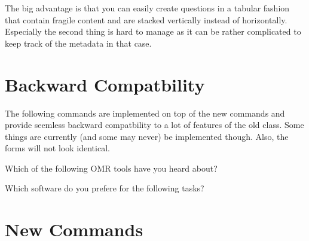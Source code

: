 \documentclass[
  english,
  print_questionnaire_id,
  oneside,
  pagemark,
  stamp]{sdapsclassic}
\begin{document}
\begin{questionnaire}
    The big advantage is that you can easily create questions in a tabular
    fashion that contain fragile content and are stacked vertically instead of
    horizontally. Especially the second thing is hard to manage as it can be
    rather complicated to keep track of the metadata in that case.

    \section{Backward Compatbility}

    The following commands are implemented on top of the new commands and provide
    seemless backward compatbility to a lot of features of the old class. Some
    things are currently (and some may never) be implemented though. Also, the
    forms will not look identical.



    \begin{choicequestion}[cols=3]{Which of the following OMR tools have you heard about?}

    \end{choicequestion}

    \begin{choicegroup}{Which software do you prefere for the following tasks?}
      \groupaddchoice{\LaTeX}

    \end{choicegroup}


    \section{New Commands}


\end{questionnaire}
\end{document}
